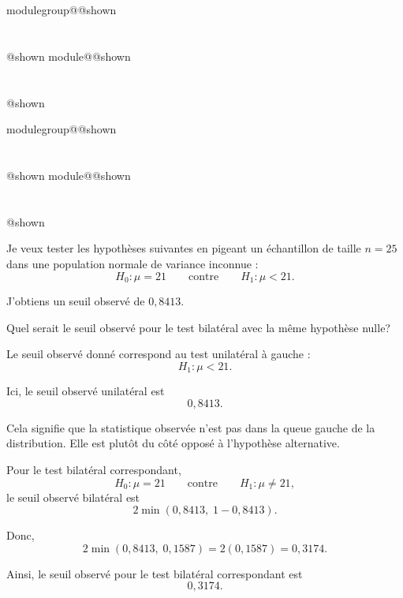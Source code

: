 \documentclass{Evaluation}
\makeatletter
\newcommand{\currentmodulekey}{}
\newcommand{\currentmoduletitle}{}
\newcommand{\currentgroupkey}{}
\newcommand{\currentgrouptitle}{}
\newcommand{\showmoduleifneeded}{%
  \ifx\currentgroupkey\empty\else
    \expandafter\ifx\csname modulegroup@\currentgroupkey @shown\endcsname\relax
      \section*{\currentgrouptitle}%
      \expandafter\gdef\csname modulegroup@\currentgroupkey @shown\endcsname{1}%
    \fi
  \fi
  \expandafter\ifx\csname module@\currentmodulekey @shown\endcsname\relax
    \section*{\currentmoduletitle}%
    \expandafter\gdef\csname module@\currentmodulekey @shown\endcsname{1}%
  \fi
}
\newenvironment{A25}{\showmoduleifneeded}{}
\newenvironment{H26r}{\showmoduleifneeded}{}
\makeatother
\begin{document}
\begin{questions}
\begin{A25}
\end{A25}

\begin{H26r}
\question {} %
Je veux tester les hypothèses suivantes en pigeant un échantillon de taille \(n=25\) dans une population normale de variance inconnue :
\[
H_0:\mu=21
\qquad \text{contre} \qquad
H_1:\mu<21.
\]

J'obtiens un seuil observé de \(0{,}8413\).

Quel serait le seuil observé pour le test bilatéral avec la même hypothèse nulle?

\begin{solution}
Le seuil observé donné correspond au test unilatéral à gauche :
\[
H_1:\mu<21.
\]

Ici, le seuil observé unilatéral est
\[
0{,}8413.
\]

Cela signifie que la statistique observée n'est pas dans la queue gauche de la distribution. Elle est plutôt du côté opposé à l'hypothèse alternative.

Pour le test bilatéral correspondant,
\[
H_0:\mu=21
\qquad \text{contre} \qquad
H_1:\mu\neq 21,
\]
le seuil observé bilatéral est
\[
2\min(0{,}8413,\;1-0{,}8413).
\]

Donc,
\[
2\min(0{,}8413,\;0{,}1587)
=
2(0{,}1587)
=
0{,}3174.
\]

Ainsi, le seuil observé pour le test bilatéral correspondant est
\[
\boxed{0{,}3174}.
\]
\end{solution}
\end{H26r}


\end{questions}
\end{document}
